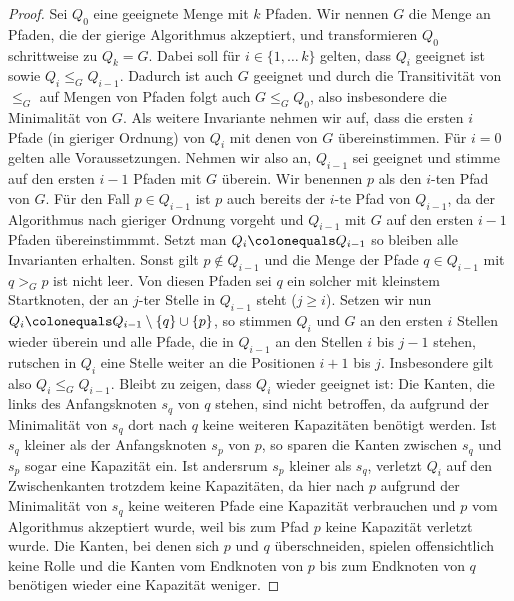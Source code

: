    \begin{proof}
       Sei $Q_0$ eine geeignete Menge mit $k$ Pfaden.
       Wir nennen $G$ die Menge an Pfaden, die der gierige Algorithmus akzeptiert, und transformieren $Q_0$ schrittweise
       zu $Q_k = G$.
       Dabei soll für $i \in \{1,\dots\,k\}$ gelten, dass $Q_i$ geeignet ist sowie $Q_i \leq_G Q_{i-1}$.
       Dadurch ist auch $G$ geeignet und durch die Transitivität von $\leq_G$ auf Mengen von Pfaden folgt auch
       $G \leq_G Q_0$, also insbesondere die Minimalität von $G$.
       Als weitere Invariante nehmen wir auf, dass die ersten $i$ Pfade (in gieriger Ordnung) von $Q_i$ mit denen von
       $G$ übereinstimmen.
       Für $i=0$ gelten alle Voraussetzungen.
       Nehmen wir also an, $Q_{i-1}$ sei geeignet und stimme auf den ersten $i-1$ Pfaden mit $G$ überein.
       Wir benennen $p$ als den $i$-ten Pfad von $G$.
       Für den Fall $p \in Q_{i-1}$ ist $p$ auch bereits der $i$-te Pfad von $Q_{i-1}$, da der Algorithmus nach
       gieriger Ordnung vorgeht und $Q_{i-1}$ mit $G$ auf den ersten $i-1$ Pfaden übereinstimmmt.
       Setzt man $Q_i \colonequals Q_{i-1}$ so bleiben alle Invarianten erhalten.
       Sonst gilt $p \notin Q_{i-1}$ und die Menge der Pfade $q \in Q_{i-1}$ mit $q >_G p$ ist nicht leer.
       Von diesen Pfaden sei $q$ ein solcher mit kleinstem Startknoten, der an $j$-ter Stelle in $Q_{i-1}$ steht
       ($j \geq i$).
       Setzen wir nun $Q_{i} \colonequals Q_{i-1} \setminus \{ q \} \cup \{ p \}$, so stimmen $Q_{i}$ und $G$ an den
       ersten $i$ Stellen wieder überein und alle Pfade, die in $Q_{i-1}$ an den Stellen $i$ bis $j-1$ stehen, rutschen
       in $Q_i$ eine Stelle weiter an die Positionen $i+1$ bis $j$.
       Insbesondere gilt also $Q_i \leq_G Q_{i-1}$.
       Bleibt zu zeigen, dass $Q_i$ wieder geeignet ist:
       Die Kanten, die links des Anfangsknoten $s_q$ von $q$ stehen, sind nicht betroffen, da aufgrund der Minimalität
       von $s_q$ dort nach $q$ keine weiteren Kapazitäten benötigt werden.
       Ist $s_q$ kleiner als der Anfangsknoten $s_p$ von $p$, so sparen die Kanten zwischen $s_q$ und $s_p$ sogar eine
       Kapazität ein.
       Ist andersrum $s_p$ kleiner als $s_q$, verletzt $Q_i$ auf den Zwischenkanten trotzdem keine Kapazitäten, da
       hier nach $p$ aufgrund der Minimalität von $s_q$ keine weiteren Pfade eine Kapazität verbrauchen und $p$ vom
       Algorithmus akzeptiert wurde, weil bis zum Pfad $p$ keine Kapazität verletzt wurde.
       Die Kanten, bei denen sich $p$ und $q$ überschneiden, spielen offensichtlich keine Rolle und die Kanten
       vom Endknoten von $p$ bis zum Endknoten von $q$ benötigen wieder eine Kapazität weniger.
   \end{proof}
